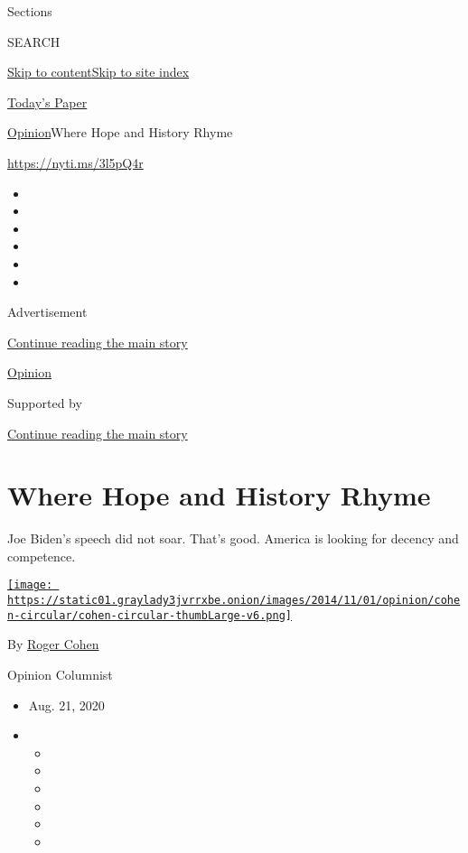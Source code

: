 Sections

SEARCH

\protect\hyperlink{site-content}{Skip to
content}\protect\hyperlink{site-index}{Skip to site index}

\href{https://myaccount.nytimes3xbfgragh.onion/auth/login?response_type=cookie\&client_id=vi}{}

\href{https://www.nytimes3xbfgragh.onion/section/todayspaper}{Today's
Paper}

\href{/section/opinion}{Opinion}\textbar{}Where Hope and History Rhyme

\url{https://nyti.ms/3l5pQ4r}

\begin{itemize}
\item
\item
\item
\item
\item
\item
\end{itemize}

Advertisement

\protect\hyperlink{after-top}{Continue reading the main story}

\href{/section/opinion}{Opinion}

Supported by

\protect\hyperlink{after-sponsor}{Continue reading the main story}

\hypertarget{where-hope-and-history-rhyme}{%
\section{Where Hope and History
Rhyme}\label{where-hope-and-history-rhyme}}

Joe Biden's speech did not soar. That's good. America is looking for
decency and competence.

\href{https://www.nytimes3xbfgragh.onion/by/roger-cohen}{\texttt{[image: https://static01.graylady3jvrrxbe.onion/images/2014/11/01/opinion/cohen-circular/cohen-circular-thumbLarge-v6.png]}}

By \href{https://www.nytimes3xbfgragh.onion/by/roger-cohen}{Roger Cohen}

Opinion Columnist

\begin{itemize}
\item
  Aug. 21, 2020
\item
  \begin{itemize}
  \item
  \item
  \item
  \item
  \item
  \item
  \end{itemize}
\end{itemize}

